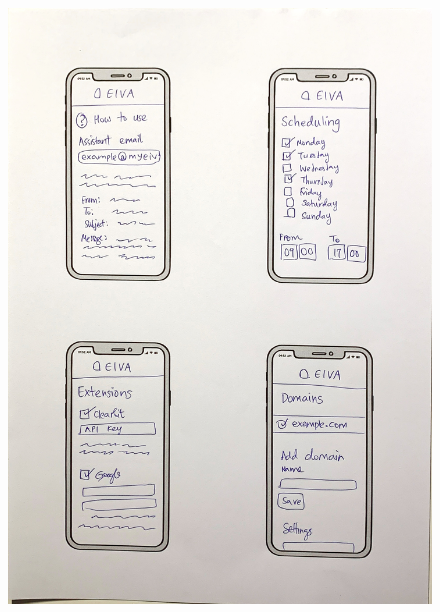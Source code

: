 \documentclass{article}
\begin{document}
\begin{figure}
	\centering
	\begin{minipage}{.5\textwidth}
		\centering
		\includegraphics[width=1\linewidth]{drawing-phone-1.jpg}

\end{minipage}
\end{figure}
\end{document}

